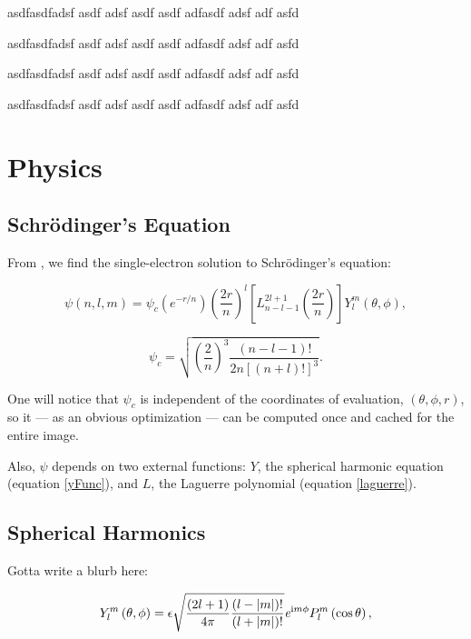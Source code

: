 \documentclass{acmsiggraph}
\begin{document}
asdfasdfadsf asdf adsf asdf asdf adfasdf adsf adf asfd

asdfasdfadsf asdf adsf asdf asdf adfasdf adsf adf asfd

asdfasdfadsf asdf adsf asdf asdf adfasdf adsf adf asfd

asdfasdfadsf asdf adsf asdf asdf adfasdf adsf adf asfd

\section{Physics}

\subsection{Schr\"{o}dinger's Equation}

From \cite{quantumBook}, we find the single-electron solution to Schr\"{o}dinger's equation:

\begin{equation}\label{psi}
\psi\left(n, l, m\right)=\psi_c
\left(\mathit{e}^{-r/n}\right)
\left(\frac{2r}{n}\right)^l
\left[L_{n-l-1}^{2l+1}
    \left(\frac{2r}{n}\right)\right]
Y_l^m\left(\theta,\phi\right),
\end{equation}

\begin{equation}\label{psiConstant}
\psi_c=\sqrt{\left(\frac{2}{n}\right)^3
    \frac{\left(n-l-1\right)!}{2n\left[\left(n+l\right)!\right]^3}}.
\end{equation}

One will notice that $\psi_c$ is independent of the coordinates of evaluation, $\left(\theta, \phi, r\right)$, so it --- as an obvious optimization --- can be computed once and cached for the entire image.

Also, $\psi$ depends on two external functions: $Y$, the spherical harmonic equation (equation \ref{yFunc}), and $L$, the Laguerre polynomial (equation \ref{laguerre}).

\subsection{Spherical Harmonics\label{sphericalHarmonics}}

Gotta write a blurb here:

\begin{equation}\label{yFunc}
Y_l^m\left(\theta,\phi\right)=\epsilon
\sqrt{\frac{\left(2l+1\right)}{4\pi}
    \frac{\left(l-\left|m\right|\right)!}{\left(l+\left|m\right|\right)!}}
\mathit{e}^{{\rm i}m\phi}
P^m_l\left(\cos\theta\right),
\end{equation}
\end{document}
